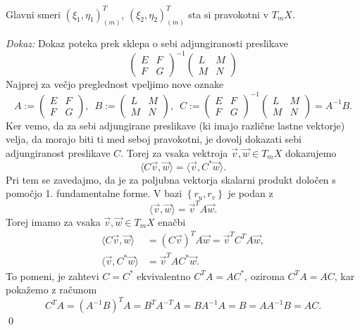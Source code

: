 \begin{izrek}
\label{izr_glavni_smeri_sta_si_pravokotni}
Glavni smeri $(\xi_1, \eta_1)_{(m)}^{T}$, $(\xi_2, \eta_2)_{(m)}^{T}$ sta si pravokotni v $T_m X$. 
\end{izrek}
\noident
{\em Dokaz:\/}
Dokaz poteka prek sklepa o sebi adjungiranosti preslikave \begin{equation*}
  \begin{pmatrix}
    E & F \\
    F & G
    \end{pmatrix}^{-1}\begin{pmatrix}
    L & M \\
    M & N
    \end{pmatrix}
\end{equation*}  
Najprej za večjo preglednost vpeljimo nove oznake \begin{equation*}
A := \begin{pmatrix}
E & F \\
F & G
\end{pmatrix}, \,\,\, B := \begin{pmatrix}
L & M \\
M & N
\end{pmatrix}, \,\,\, C := \begin{pmatrix}
  E & F \\
  F & G
  \end{pmatrix}^{-1}\begin{pmatrix}
  L & M \\
  M & N
  \end{pmatrix} = A^{-1}B.
\end{equation*}  
Ker vemo, da za sebi adjungirane preslikave (ki imajo različne lastne vektorje) velja, da morajo biti ti med seboj pravokotni,
je dovolj dokazati sebi adjungiranost preslikave $C$. Torej za vsaka vektroja $\vec{v}, \vec{w} \in  T_m X$ dokazujemo \begin{equation*}
\langle C\vec{v}, \vec{w} \rangle = \langle \vec{v}, C^{*} \vec{w} \rangle.
\end{equation*}  
Pri tem se zavedajmo, da je za poljubna vektorja skalarni produkt določen s pomočjo 1. fundamentalne forme. V bazi $\left\{ r_u, r_v\right\} $ je podan z \begin{equation*}
  \langle \vec{v}, \vec{w} \rangle = \vec{v}^{T} A \vec{w}. 
\end{equation*}  
Torej imamo za vsaka $\vec{v}, \vec{w} \in T_mX$ enačbi \begin{align*}
  \langle C\vec{v}, \vec{w} \rangle &= (C\vec{v})^{T} A \vec{w} = \vec{v}^{T} C^{T} A \vec{w}, \\
  \langle \vec{v}, C^{*} \vec{w} \rangle  &= \vec{v}^{T} A C^{*} \vec{w}.
\end{align*}
To pomeni, je zahtevi $C = C^{*}$ ekvivalentno $C^{T}A= AC^{*}$, oziroma $C^{T}A = AC$, kar pokažemo z računom \begin{equation*}
C^{T}A = (A^{-1}B)^{T}A = B^{T}A^{-T}A = BA^{-1}A = B = A A^{-1} B = AC.
\end{equation*}  
\qed

